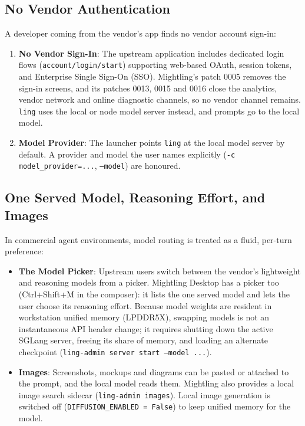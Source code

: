 \documentclass[11pt]{article}
\newcommand{\code}[1]{\texttt{#1}}
\begin{document}
\subsection{No Vendor Authentication}

A developer coming from the vendor's app finds no vendor account sign-in:
\begin{enumerate}
    \item \textbf{No Vendor Sign-In}: The upstream application includes dedicated login flows
    (\code{account/}\allowbreak\code{login/start}) supporting web-based OAuth, session tokens, and Enterprise Single Sign-On (SSO).
    Mightling's patch 0005 removes the sign-in screens, and its patches 0013, 0015 and 0016 close the analytics, vendor
    network and online diagnostic channels, so no vendor channel remains. \code{ling} uses the local or node model server
    instead, and prompts go to the local model.
    \item \textbf{Model Provider}: The launcher points \code{ling} at the local model server by default. A provider and
    model the user names explicitly (\code{-c model\_provider=...}, \code{--model}) are honoured.
\end{enumerate}

\subsection{One Served Model, Reasoning Effort, and Images}

In commercial agent environments, model routing is treated as a fluid, per-turn preference:
\begin{itemize}
    \item \textbf{The Model Picker}: Upstream users switch between the vendor's lightweight and reasoning models from
    a picker. Mightling Desktop has a picker too (Ctrl+Shift+M in the composer): it lists the one served model and lets
    the user choose its reasoning effort. Because model weights are resident in workstation unified memory (LPDDR5X),
    swapping models is not an instantaneous API header change; it requires shutting down the active SGLang server,
    freeing its share of memory, and loading an alternate checkpoint (\code{ling-admin server start --model ...}).
    \item \textbf{Images}: Screenshots, mockups and diagrams can be pasted or attached to the prompt, and the local model
    reads them. Mightling also provides a local image search sidecar (\code{ling-admin images}). Local image generation
    is switched off (\code{DIFFUSION\_ENABLED = False}) to keep unified memory for the model.
\end{itemize}
\end{document}
